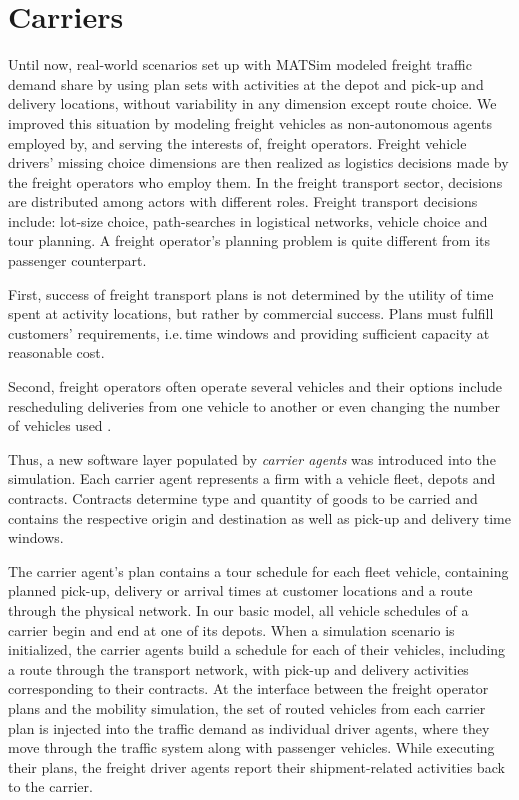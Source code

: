 \section{Carriers}
\label{sec:carriers}
Until now, real-world scenarios set up with MATSim modeled freight traffic demand share by using plan sets with activities at the depot and pick-up and delivery locations, without variability in any dimension except route choice. We improved this situation by modeling freight vehicles as non-autonomous agents employed by, and serving the interests of, freight operators. Freight vehicle drivers' missing choice dimensions are then realized as logistics decisions made by the freight operators who employ them. In the freight transport sector, decisions are distributed among actors with different roles. Freight transport decisions include: lot-size choice, path-searches in logistical networks, vehicle choice and tour planning. A freight operator's planning problem is quite different from its passenger counterpart.

First,  success of freight transport plans is not determined by the utility of time
spent at activity locations, but rather by commercial success. Plans must fulfill
customers' requirements, i.e.\,time windows and providing sufficient capacity at
reasonable cost.

Second, freight operators often operate several vehicles and their
options include rescheduling deliveries from one vehicle to another or even changing the
number of vehicles used .

Thus, a new software layer populated by \emph{carrier agents} was introduced into the
simulation. Each carrier agent represents a firm with a vehicle fleet, depots and contracts.
Contracts determine type and quantity of goods to be carried and contains the respective 
origin and destination as well as pick-up and delivery time windows.

The carrier agent's plan contains a tour schedule  for each fleet  vehicle, containing 
planned pick-up, delivery or arrival times at customer locations and a route through 
the physical network. In our basic model, all vehicle schedules of a carrier begin and end at one of its depots.
When a simulation scenario is initialized, the carrier agents build a schedule for each of their vehicles, 
including a route through the transport network, with pick-up and delivery activities corresponding to their contracts.
At the interface between the freight operator plans and the mobility simulation, the set of routed vehicles 
from each carrier plan is injected into the traffic demand as individual driver agents, where they move 
through the traffic system along with passenger vehicles. While executing their plans, the freight driver 
agents report their shipment-related activities back to the carrier.

